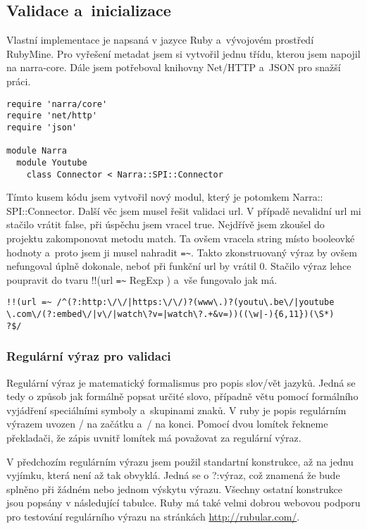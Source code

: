 \subsection{Validace a~inicializace}
\par Vlastní implementace je napsaná v jazyce Ruby a~vývojovém prostředí RubyMine. Pro vyřešení metadat jsem si vytvořil jednu třídu, kterou jsem napojil na narra-core. Dále jsem potřeboval knihovny Net/HTTP a~JSON pro snažší práci.
\begin{verbatim}
require 'narra/core'
require 'net/http'
require 'json'

module Narra
  module Youtube
    class Connector < Narra::SPI::Connector
\end{verbatim}
\par Tímto kusem kódu jsem vytvořil nový modul, který je potomkem Narra::\\SPI::Connector. Další věc jsem musel řešit validaci url. V případě nevalidní url mi stačilo vrátit false, při úspěchu jsem vracel true. Nejdřívě jsem zkoušel do projektu zakomponovat metodu match. Ta ovšem vracela string místo booleovké hodnoty a~proto jsem ji musel nahradit \verb|=~|. Takto zkonstruovaný výraz by ovšem nefungoval úplně dokonale, neboť při funkční url by vrátil 0. Stačilo výraz lehce poupravit do tvaru !!(url \verb|=~| RegExp ) a~vše fungovalo jak má.
\begin{verbatim}
!!(url =~ /^(?:http:\/\/|https:\/\/)?(www\.)?(youtu\.be\/|youtube
\.com\/(?:embed\/|v\/|watch\?v=|watch\?.+&v=))((\w|-){6,11})(\S*)
?$/
\end{verbatim}
\subsubsection{Regulární výraz pro validaci}
\par Regulární výraz\cite{regexp} je matematický formalismus pro popis slov/vět jazyků. Jedná se tedy o způsob jak formálně popsat určité slovo, případně větu pomocí formálního vyjádření speciálními symboly a~skupinami znaků. V ruby\cite{ruby} je popis regulárním výrazem uvozen / na začátku a~/ na konci. Pomocí dvou lomítek řekneme překladači, že zápis uvnitř lomítek má považovat za regulární výraz.
\par V předchozím regulárním výrazu jsem použil standartní konstrukce, až na jednu vyjímku, která není až tak obvyklá. Jedná se o ?:výraz, což znamená že bude splněno při žádném nebo jednom výskytu výrazu. Všechny ostatní konstrukce jsou popsány v následující tabulce. Ruby má také velmi dobrou webovou podporu pro testování regulárního výrazu na stránkách \url{http://rubular.com/}\cite{michaellovitt}.

